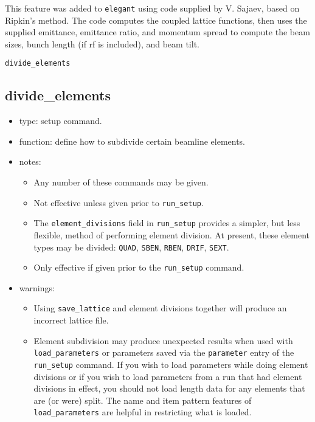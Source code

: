\documentclass[11pt]{article}
\begin{document}
This feature was added to {\tt elegant} using code supplied by V. Sajaev, based on Ripkin's method.
The code computes the coupled lattice functions, then uses the supplied emittance, emittance ratio,
and momentum spread to compute the beam sizes, bunch length (if rf is included), and beam tilt.

\begin{latexonly}
\newpage
\begin{center}{\Large\verb|divide_elements|}\end{center}
\end{latexonly}
\subsection{divide\_elements \label{subsec:divideelements}}

\begin{itemize}
\item type: setup command.
\item function: define how to subdivide certain beamline elements.
\item notes: 
	\begin{itemize}
	\item Any number of these commands may be given.  
	\item Not effective unless given prior to \verb|run_setup|.
	\item The \verb|element_divisions|
 field in \verb|run_setup| provides a simpler, but less flexible, method of performing
 element division.  At present, these element types may be divided: 
 \verb|QUAD|, \verb|SBEN|, \verb|RBEN|, \verb|DRIF|,  \verb|SEXT|.
	\item Only effective if given prior to the \verb|run_setup| command.
	\end{itemize}
\item warnings:	
	\begin{itemize}
	\item Using \verb|save_lattice| and element divisions together will
	produce an incorrect lattice file.
	\item Element subdivision may
	produce unexpected results when used with \verb|load_parameters|
	or parameters saved via the \verb|parameter|
	entry of the \verb|run_setup| command.
	If you wish to load parameters while doing element divisions or if
	you wish to load parameters from a run that had element divisions
	in effect, you should not load length data for any elements that
	are (or were) split.  The name and item pattern features of 
	\verb|load_parameters| are helpful in restricting what is loaded.
	\end{itemize}
\end{itemize}
\end{document}

